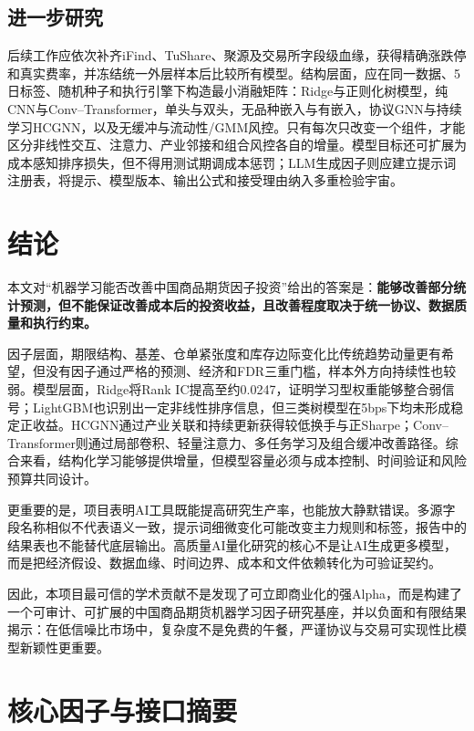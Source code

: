 \documentclass[UTF8,zihao=-4,fontset=ubuntu]{ctexart}
\begin{document}
\subsection{进一步研究}

后续工作应依次补齐iFind、TuShare、聚源及交易所字段级血缘，获得精确涨跌停和真实费率，并冻结统一外层样本后比较所有模型。结构层面，应在同一数据、5日标签、随机种子和执行引擎下构造最小消融矩阵：Ridge与正则化树模型，纯CNN与Conv--Transformer，单头与双头，无品种嵌入与有嵌入，协议GNN与持续学习HCGNN，以及无缓冲与流动性/GMM风控。只有每次只改变一个组件，才能区分非线性交互、注意力、产业邻接和组合风控各自的增量。模型目标还可扩展为成本感知排序损失，但不得用测试期调成本惩罚；LLM生成因子则应建立提示词注册表，将提示、模型版本、输出公式和接受理由纳入多重检验宇宙。

\section{结论}

本文对“机器学习能否改善中国商品期货因子投资”给出的答案是：\textbf{能够改善部分统计预测，但不能保证改善成本后的投资收益，且改善程度取决于统一协议、数据质量和执行约束。}

因子层面，期限结构、基差、仓单紧张度和库存边际变化比传统趋势动量更有希望，但没有因子通过严格的预测、经济和FDR三重门槛，样本外方向持续性也较弱。模型层面，Ridge将Rank IC提高至约0.0247，证明学习型权重能够整合弱信号；LightGBM也识别出一定非线性排序信息，但三类树模型在5bps下均未形成稳定正收益。HCGNN通过产业关联和持续更新获得较低换手与正Sharpe；Conv--Transformer则通过局部卷积、轻量注意力、多任务学习及组合缓冲改善路径。综合来看，结构化学习能够提供增量，但模型容量必须与成本控制、时间验证和风险预算共同设计。

更重要的是，项目表明AI工具既能提高研究生产率，也能放大静默错误。多源字段名称相似不代表语义一致，提示词细微变化可能改变主力规则和标签，报告中的结果表也不能替代底层输出。高质量AI量化研究的核心不是让AI生成更多模型，而是把经济假设、数据血缘、时间边界、成本和文件依赖转化为可验证契约。

因此，本项目最可信的学术贡献不是发现了可立即商业化的强Alpha，而是构建了一个可审计、可扩展的中国商品期货机器学习因子研究基座，并以负面和有限结果揭示：在低信噪比市场中，复杂度不是免费的午餐，严谨协议与交易可实现性比模型新颖性更重要。

\appendix
\section{核心因子与接口摘要}
\end{document}

